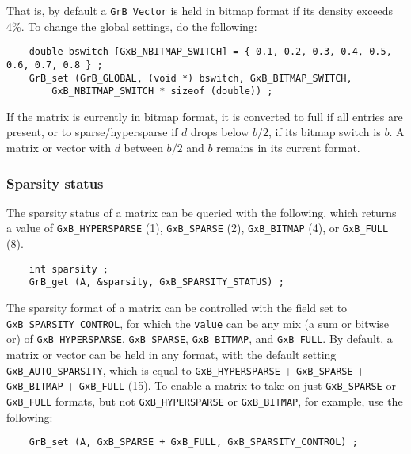That is, by default a \verb'GrB_Vector' is held in bitmap format if its density
exceeds 4\%.  To change the global settings, do the following:

{\footnotesize
\begin{verbatim}
    double bswitch [GxB_NBITMAP_SWITCH] = { 0.1, 0.2, 0.3, 0.4, 0.5, 0.6, 0.7, 0.8 } ;
    GrB_set (GrB_GLOBAL, (void *) bswitch, GxB_BITMAP_SWITCH,
        GxB_NBITMAP_SWITCH * sizeof (double)) ;
\end{verbatim}
}

If the matrix is currently in bitmap format, it is converted to full if all
entries are present, or to sparse/hypersparse if $d$ drops below $b/2$, if its
bitmap switch is $b$.  A matrix or vector with $d$ between $b/2$ and $b$
remains in its current format.

\subsubsection{Sparsity status}
\label{sparsity_status}

The sparsity status of a matrix can be queried with the following, which
returns a value of \verb'GxB_HYPERSPARSE' (1), \verb'GxB_SPARSE' (2),
\verb'GxB_BITMAP' (4), or \verb'GxB_FULL' (8).

{\footnotesize
\begin{verbatim}
    int sparsity ;
    GrB_get (A, &sparsity, GxB_SPARSITY_STATUS) ; \end{verbatim}}

The sparsity format of a matrix can be controlled with the field set to
\verb'GxB_SPARSITY_CONTROL', for which the \verb'value' can be any mix (a sum or bitwise
or) of \verb'GxB_HYPERSPARSE', \verb'GxB_SPARSE', \verb'GxB_BITMAP', and
\verb'GxB_FULL'.  By default, a matrix or vector can be held in any format,
with the default setting \verb'GxB_AUTO_SPARSITY', which is equal to
\verb'GxB_HYPERSPARSE' + \verb'GxB_SPARSE' + \verb'GxB_BITMAP' +
\verb'GxB_FULL' (15).  To enable a matrix to take on just \verb'GxB_SPARSE' or
\verb'GxB_FULL' formats, but not \verb'GxB_HYPERSPARSE' or \verb'GxB_BITMAP',
for example, use the following:

{\footnotesize
\begin{verbatim}
    GrB_set (A, GxB_SPARSE + GxB_FULL, GxB_SPARSITY_CONTROL) ; \end{verbatim}}

